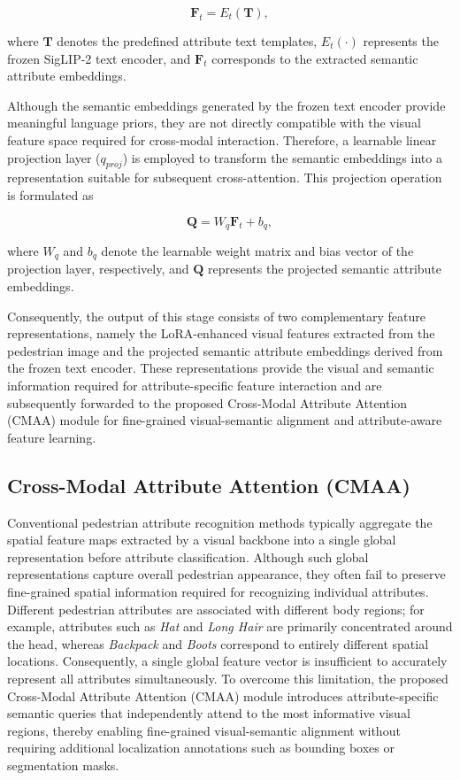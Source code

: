 \documentclass{ieeeaccess}
\begin{document}
\begin{equation}
\mathbf{F}_{t}=E_{t}(\mathbf{T}),
\label{eq:text_features}
\end{equation}

where $\mathbf{T}$ denotes the predefined attribute text templates, $E_{t}(\cdot)$ represents the frozen SigLIP-2 text encoder, and $\mathbf{F}_{t}$ corresponds to the extracted semantic attribute embeddings.

Although the semantic embeddings generated by the frozen text encoder provide meaningful language priors, they are not directly compatible with the visual feature space required for cross-modal interaction. Therefore, a learnable linear projection layer ($q_{proj}$) is employed to transform the semantic embeddings into a representation suitable for subsequent cross-attention. This projection operation is formulated as

\begin{equation}
\mathbf{Q}=W_{q}\mathbf{F}_{t}+b_{q},
\label{eq:qproj}
\end{equation}

where $W_{q}$ and $b_{q}$ denote the learnable weight matrix and bias vector of the projection layer, respectively, and $\mathbf{Q}$ represents the projected semantic attribute embeddings.

Consequently, the output of this stage consists of two complementary feature representations, namely the LoRA-enhanced visual features extracted from the pedestrian image and the projected semantic attribute embeddings derived from the frozen text encoder. These representations provide the visual and semantic information required for attribute-specific feature interaction and are subsequently forwarded to the proposed Cross-Modal Attribute Attention (CMAA) module for fine-grained visual-semantic alignment and attribute-aware feature learning.


\subsection{Cross-Modal Attribute Attention (CMAA)}

Conventional pedestrian attribute recognition methods typically aggregate the spatial feature maps extracted by a visual backbone into a single global representation before attribute classification. Although such global representations capture overall pedestrian appearance, they often fail to preserve fine-grained spatial information required for recognizing individual attributes. Different pedestrian attributes are associated with different body regions; for example, attributes such as \textit{Hat} and \textit{Long Hair} are primarily concentrated around the head, whereas \textit{Backpack} and \textit{Boots} correspond to entirely different spatial locations. Consequently, a single global feature vector is insufficient to accurately represent all attributes simultaneously. To overcome this limitation, the proposed Cross-Modal Attribute Attention (CMAA) module introduces attribute-specific semantic queries that independently attend to the most informative visual regions, thereby enabling fine-grained visual-semantic alignment without requiring additional localization annotations such as bounding boxes or segmentation masks.
\end{document}
